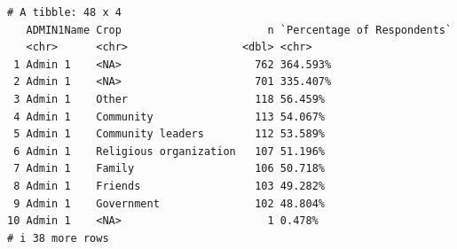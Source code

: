 \documentclass[
  letterpaper,
  DIV=11,
  numbers=noendperiod]{scrreprt}
\begin{document}
\begin{verbatim}
# A tibble: 48 x 4
   ADMIN1Name Crop                       n `Percentage of Respondents`
   <chr>      <chr>                  <dbl> <chr>                      
 1 Admin 1    <NA>                     762 364.593%                   
 2 Admin 1    <NA>                     701 335.407%                   
 3 Admin 1    Other                    118 56.459%                    
 4 Admin 1    Community                113 54.067%                    
 5 Admin 1    Community leaders        112 53.589%                    
 6 Admin 1    Religious organization   107 51.196%                    
 7 Admin 1    Family                   106 50.718%                    
 8 Admin 1    Friends                  103 49.282%                    
 9 Admin 1    Government               102 48.804%                    
10 Admin 1    <NA>                       1 0.478%                     
# i 38 more rows
\end{verbatim}
\end{document}
